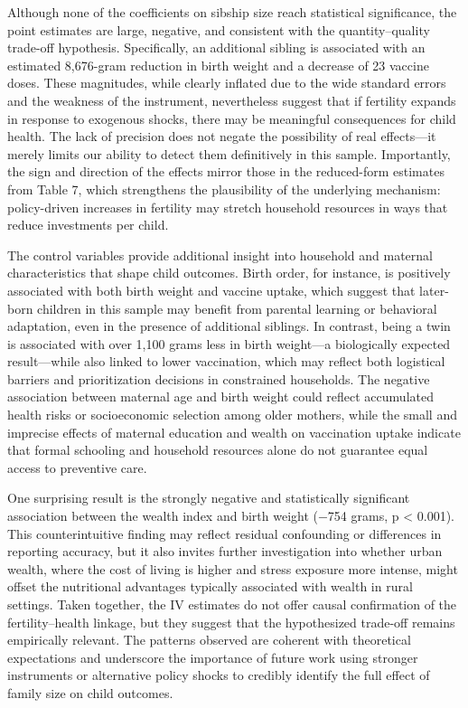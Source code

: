 \documentclass[]{AEA}
\begin{document}
Although none of the coefficients on sibship size reach statistical
significance, the point estimates are large, negative, and consistent
with the quantity--quality trade-off hypothesis. Specifically, an
additional sibling is associated with an estimated 8,676-gram reduction
in birth weight and a decrease of 23 vaccine doses. These magnitudes,
while clearly inflated due to the wide standard errors and the weakness
of the instrument, nevertheless suggest that if fertility expands in
response to exogenous shocks, there may be meaningful consequences for
child health. The lack of precision does not negate the possibility of
real effects---it merely limits our ability to detect them definitively
in this sample. Importantly, the sign and direction of the effects
mirror those in the reduced-form estimates from Table 7, which
strengthens the plausibility of the underlying mechanism: policy-driven
increases in fertility may stretch household resources in ways that
reduce investments per child.

The control variables provide additional insight into household and
maternal characteristics that shape child outcomes. Birth order, for
instance, is positively associated with both birth weight and vaccine
uptake, which suggest that later-born children in this sample may
benefit from parental learning or behavioral adaptation, even in the
presence of additional siblings. In contrast, being a twin is associated
with over 1,100 grams less in birth weight---a biologically expected
result---while also linked to lower vaccination, which may reflect both
logistical barriers and prioritization decisions in constrained
households. The negative association between maternal age and birth
weight could reflect accumulated health risks or socioeconomic selection
among older mothers, while the small and imprecise effects of maternal
education and wealth on vaccination uptake indicate that formal
schooling and household resources alone do not guarantee equal access to
preventive care.

One surprising result is the strongly negative and statistically
significant association between the wealth index and birth weight (−754
grams, p \textless{} 0.001). This counterintuitive finding may reflect
residual confounding or differences in reporting accuracy, but it also
invites further investigation into whether urban wealth, where the cost
of living is higher and stress exposure more intense, might offset the
nutritional advantages typically associated with wealth in rural
settings. Taken together, the IV estimates do not offer causal
confirmation of the fertility--health linkage, but they suggest that the
hypothesized trade-off remains empirically relevant. The patterns
observed are coherent with theoretical expectations and underscore the
importance of future work using stronger instruments or alternative
policy shocks to credibly identify the full effect of family size on
child outcomes.
\end{document}
